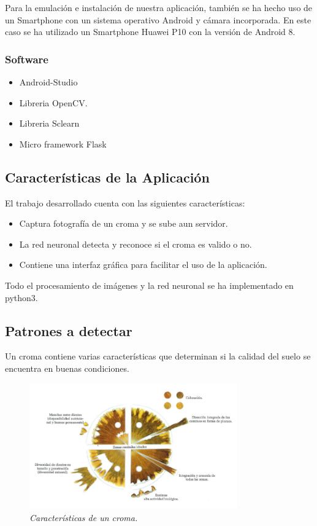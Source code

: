 Para la emulación e instalación de nuestra aplicación, también se ha hecho uso de un Smartphone con un sistema operativo Android y cámara incorporada. En este caso se ha utilizado un Smartphone Huawei P10 con la versión de Android 8.

\subsubsection{Software}
\begin{itemize}
\item Android-Studio
\item Libreria OpenCV.
\item Libreria Sclearn
\item Micro framework Flask
\end{itemize}

\subsection{Características de la Aplicación}
El trabajo desarrollado cuenta con las siguientes características:
\begin{itemize}
\item Captura fotografía de un croma y se sube aun servidor.
\item La red neuronal detecta y reconoce si el croma es valido o no.
\item Contiene una interfaz gráfica para facilitar el uso de la aplicación.
\end{itemize}

Todo el procesamiento de imágenes y la red neuronal se ha implementado en python3.


\subsection{Patrones a detectar}

Un croma contiene varias características que determinan si la calidad del suelo se encuentra en buenas condiciones. 

\begin{figure}[H]
 \centering	
   \includegraphics[width=0.8\textwidth]{images/3.png}
   \caption{\textit{Características de un croma.}}
   \end{figure}	
   
